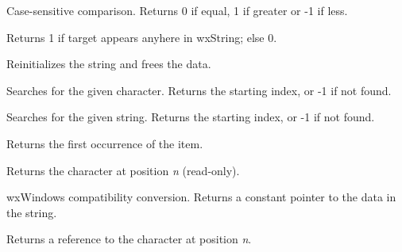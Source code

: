 Case-sensitive comparison. Returns 0 if equal, 1 if greater or -1 if less.

\label{wxstringContains}


Returns 1 if target appears anyhere in wxString; else 0.

\label{wxstringempty}


Reinitializes the string and frees the data.

\label{wxstringfind}


Searches for the given character. Returns the starting index, or -1 if not found.


Searches for the given string. Returns the starting index, or -1 if not found.

\label{wxstringfirst}





Returns the first occurrence of the item.

\label{wxstringgetchar}


Returns the character at position {\it n} (read-only).

\label{wxstringGetData}


wxWindows compatibility conversion. Returns a constant pointer to the data in the string.

\label{wxstringgetwritablechar}


Returns a reference to the character at position {\it n}.

